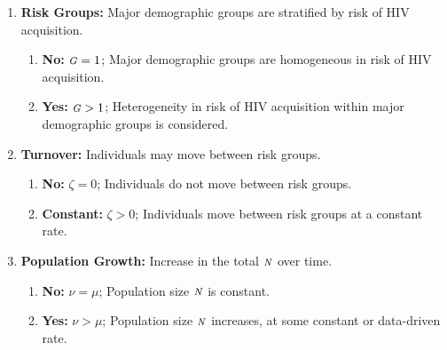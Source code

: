 \begin{fboxed}
  \begin{enumerate}[leftmargin=1em]
    \item\label{ass:risk-groups}\textbf{Risk Groups:}
    Major demographic groups are stratified by risk of HIV acquisition.
    \begin{enumerate}
      \item\label{ass:risk-groups-no}\textbf{No:} ${\mbox{\footnotesize{\textit{G}}}} = 1$;
      Major demographic groups are homogeneous in risk of HIV acquisition.
      \item\label{ass:risk-groups-yes}\textbf{Yes:} ${\mbox{\footnotesize{\textit{G}}}} > 1$;
      Heterogeneity in risk of HIV acquisition within major demographic groups is considered.
    \end{enumerate}
    \item\label{ass:turnover}\textbf{Turnover:}
    Individuals may move between risk groups.
    \begin{enumerate}
      \item\textbf{No:} $\zeta = 0$;
      Individuals do not move between risk groups.
      \item\textbf{Constant:} $\zeta > 0$;
      Individuals move between risk groups at a constant rate.
    \end{enumerate}
    \item\label{ass:pop-growth}\textbf{Population Growth:}
    Increase in the total ${\mbox{\footnotesize{\textit{N}}}}$ over time.
    \begin{enumerate}
      \item\textbf{No:} $\nu = \mu$;
      Population size ${\mbox{\footnotesize{\textit{N}}}}$ is constant.
      \item\textbf{Yes:} $\nu > \mu$;
      Population size ${\mbox{\footnotesize{\textit{N}}}}$ increases, at some constant or data-driven rate.
    \end{enumerate}
  \end{enumerate}
\end{fboxed}
